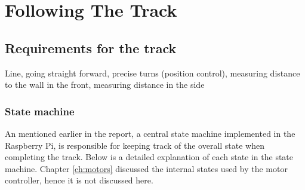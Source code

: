 \chapter{Following The Track}
\label{chap:track} 

\section{Requirements for the track}
Line, going straight forward, precise turns (position control), measuring distance to the wall in the front, measuring distance in the side

\subsection{State machine}
An mentioned earlier in the report, a central state machine implemented in the Raspberry Pi, is responsible for keeping track of the overall state when completing the track. Below is a detailed explanation of each state in the state machine. Chapter \ref{ch:motors} discussed the internal states used by the motor controller, hence it is not discussed here.

